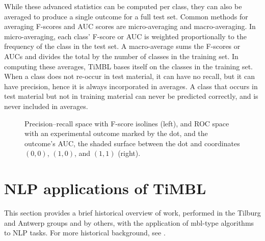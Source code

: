 \documentclass{book}
\begin{document}
While these advanced statistics can be computed per class, they can
also be averaged to produce a single outcome for a full test
set. Common methods for averaging F-scores and AUC scores are
micro-averaging and macro-averaging. In micro-averaging, each class'
F-score or AUC is weighted proportionally to the frequency of the
class in the test set. A macro-average sums the F-scores or AUCs
and divides the total by the number of classes in the training set. In
computing these averages, TiMBL bases itself on the classes in the
training set. When a class does not re-occur in test material, it can
have no recall, but it can have precision, hence it is always
incorporated in averages. A class that occurs in test material but not
in training material can never be predicted correctly, and is never
included in averages.

\begin{figure}
\begin{center}

\begin{minipage}[t]{0.53\textwidth}
\end{minipage}\hfill
\begin{minipage}[t]{0.47\textwidth}
\end{minipage}

\end{center}
\caption{Precision--recall space with F-score isolines (left), and ROC
  space with an experimental outcome marked by the dot, and the
  outcome's AUC, the shaded surface between the dot and coordinates
  $(0,0)$, $(1,0)$, and $(1,1)$ (right). \label{spaces}}
\end{figure}



\section{NLP applications of TiMBL}
\label{furtherreading}

This section provides a brief historical overview of work, performed
in the Tilburg and Antwerp groups and by others, with the application
of {\sc mbl}-type algorithms to NLP tasks. For more historical
background, see \cite{Daelemans+05}.
\end{document}
